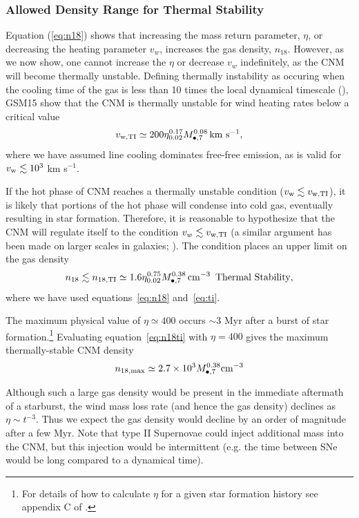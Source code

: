 \documentclass[usenatbib,fleqn]{mnras}
\newcommand{\Mbh}[1][]{M_{\bullet#1}}
\begin{document}
\subsubsection{Allowed Density Range for Thermal Stability}

Equation (\ref{eq:n18}) shows that increasing the mass return
parameter, $\eta$, or decreasing the heating parameter $v_w$,
increases the gas density, $n_{18}$.  However, as we now show, one
cannot increase the $\eta$ or decrease $v_w$ indefinitely, as the CNM
will become thermally unstable.  Defining thermally instability as
occuring when the cooling time of the gas is less than 10 times the
local dynamical timescale (\citealt{McCourt+2012}), GSM15 show that the
CNM is thermally unstable for wind heating rates below a critical
value
\begin{equation}
v_{\rm w,TI}\simeq 200 \eta_{0.02}^{0.17} \Mbh[,7]^{0.08} \,{\rm km \,\,s^{-1}},
\label{eq:ti}
\end{equation}
where we have assumed line cooling dominates free-free emission, as is valid for $v_{\rm w} \lesssim 10^{3}$ km s$^{-1}$.

If the hot phase of CNM reaches a thermally unstable condition
($v_{\rm w} \lesssim v_{\rm w,TI}$), it is likely that portions of the
hot phase will condense into cold gas, eventually resulting in star
formation.  Therefore, it is reasonable to hypothesize that the CNM
will regulate itself to the condition $v_w \lesssim v_{\rm w,TI}$ (a
similar argument has been made on larger scales in galaxies;
\citealt{Voit+2015}).  The condition places an upper limit on the gas
density
\begin{equation}
n_{18} \lesssim n_{\rm 18,TI}\simeq 1.6 \eta_{0.02}^{0.75} \Mbh[,7]^{0.38} \, {\rm cm^{-3}}\,\,\,\text{Thermal Stability}
\label{eq:n18ti},
\end{equation}
where we have used equations~\eqref{eq:n18} and~\eqref{eq:ti}.

The maximum physical value of $\eta\simeq 400$ occurs $\sim 3$ Myr after a burst of star formation.\footnote{For details
  of how to calculate $\eta$ for a given star formation history see
  appendix C of \citet{Generozov+2015}.}  Evaluating equation~\eqref{eq:n18ti} with
$\eta=400$ gives the maximum thermally-stable CNM density
\begin{equation}
n_{\rm 18,max} \simeq 2.7\times 10^{3} \Mbh[,7]^{0.38} {\rm cm^{-3}}
\label{eq:n18max}
\end{equation}

Although such a large gas density would be present in the immediate aftermath of a starburst, the wind mass loss rate (and hence the gas density) declines as $\eta \sim t^{-3}$. Thus we expect the gas density would decline by an order of magnitude after a few Myr. Note that type II Supernovae could inject additional mass into the CNM, but this injection would be intermittent (e.g. the time between SNe would be long compared to a dynamical time).
\end{document}
